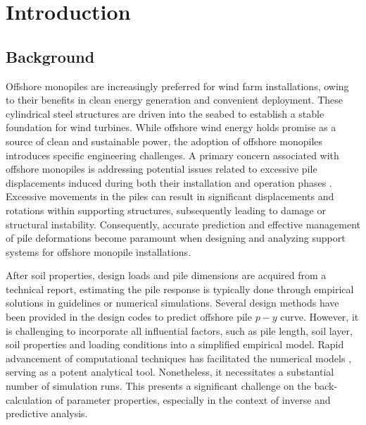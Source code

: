 \chapter{Introduction}
\label{intro}

\section{Background}

Offshore monopiles are increasingly preferred for wind farm installations, owing to their benefits in clean energy generation and convenient deployment. These cylindrical steel structures are driven into the seabed to establish a stable foundation for wind turbines. While offshore wind energy holds promise as a source of clean and sustainable power, the adoption of offshore monopiles introduces specific engineering challenges. A primary concern associated with offshore monopiles is addressing potential issues related to excessive pile displacements induced during both their installation and operation phases \citep{byrne2003,randolph2005}. Excessive movements in the piles can result in significant displacements and rotations within supporting structures, subsequently leading to damage or structural instability. Consequently, accurate prediction and effective management of pile deformations become paramount when designing and analyzing support systems for offshore monopile installations.





After soil properties, design loads and pile dimensions are acquired from a technical report, estimating the pile response is typically done through empirical solutions in guidelines or numerical simulations. Several design methods have been provided in the design codes \citep{api2011,bhattacharya2019} to predict offshore pile $p-y$ curve. However, it is challenging to incorporate all influential factors, such as pile length, soil layer, soil properties and loading conditions into a simplified empirical model. Rapid advancement of computational techniques has facilitated the numerical models \citep{randolph2017,taborda2020,zdravkovic2020,royston2022}, serving as a potent analytical tool. Nonetheless, it necessitates a substantial number of simulation runs. This presents a significant challenge on the back-calculation of parameter properties, especially in the context of inverse and predictive analysis.

